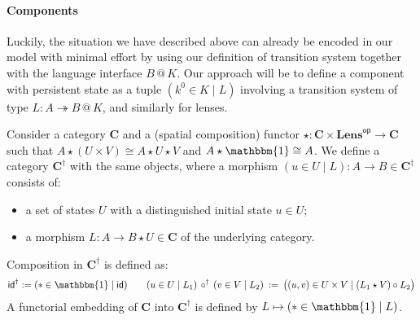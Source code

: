 \documentclass[acmsmall,screen,review,anonymous]{acmart}
\newcommand{\kw}[1]{\ensuremath{ \mathsf{#1} }}
\newcommand{\intl}[1]{#1^0}
\begin{document}
\paragraph{Components} %

Luckily,
the situation we have described above
can already be encoded in our model with minimal effort
by using our definition of transition system
together with the language interface $B \mathbin@ K$.
Our approach will be to define
a component with persistent state as a tuple
$(\intl{k} \in K \mid L)$
involving a transition system of type
$L : A \twoheadrightarrow B \mathbin@ K$,
and similarly for lenses.

\begin{definition} \label{def:slts} %
Consider a category $\mathbf{C}$
and a (spatial composition) functor
${\star} : \mathbf{C} \times \mathbf{Lens}^\kw{op} \rightarrow \mathbf{C}$
such that
$
  A \star (U \times V) \cong A \star U \star V
$ and $
  A \star \mathbbm{1} \cong A
$.
We define a category $\mathbf{C}^\dagger$
with the same objects,
where a morphism
$(u \in U \mid L) : A \rightarrow B \in \mathbf{C}^\dagger$
consists of:
\begin{itemize}
  \item a set of states $U$ with a distinguished initial state $u \in U$;
  \item a morphism $L : A \rightarrow B \star U \in \mathbf{C}$
    of the underlying category.
\end{itemize}
Composition in $\mathbf{C}^\dagger$ is defined as:
\[
  \kw{id}^\dagger := (* \in \mathbbm{1} \mid \kw{id})
  \qquad
  (u \in U \mid L_1) \,\circ^\dagger\, (v \in V \mid L_2) \::=\:
  \big( (u, v) \in U \times V \mid
        (L_1 \star V) \circ L_2 \big)
\]
A functorial embedding of $\mathbf{C}$ into $\mathbf{C}^\dagger$
is defined by $L \mapsto (* \in \mathbbm{1} \mid L)$.
\end{definition}
\end{document}

